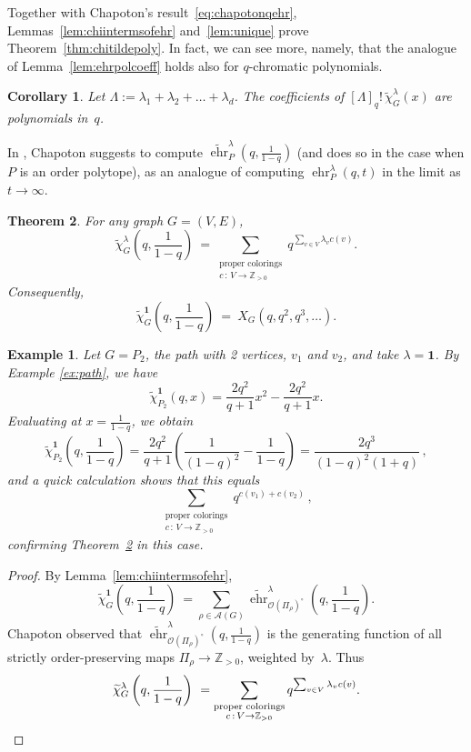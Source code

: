 \documentclass[11pt]{amsart}
\newtheorem{theorem}{Theorem} %
\newtheorem{corollary}[theorem]{Corollary}
\newtheorem{exam}{Example}
\newenvironment{example}{\begin{exam}\sf}{\end{exam}}
\newcommand\ehr{\operatorname{ehr}}
\newcommand\ZZ{\mathbb{Z}}
\newcommand\bone{\mathbf{1}}
\begin{document}
Together with Chapoton's result~\eqref{eq:chapotonqehr},  Lemmas~\ref{lem:chiintermsofehr} and~\ref{lem:unique} prove Theorem~\ref{thm:chitildepoly}. 
In fact, we can see more, namely, that the analogue of Lemma~\ref{lem:ehrpolcoeff} holds also for $q$-chromatic polynomials.

\begin{corollary}
Let $\Lambda := \lambda_1 + \lambda_2 + \dots + \lambda_d$.
The coefficients of $[\Lambda]_q! \, \widetilde{\chi}^\lambda_G(x)$ are polynomials in~$q$.
\end{corollary}

In \cite[Section~4.1]{Chapoton}, Chapoton suggests to compute $\widetilde{\ehr}^\lambda_P (q, \frac{ 1 }{
1-q })$ (and does so in the case when $P$ is an order polytope), as an analogue of computing $\ehr_P^\lambda(q,t)$ in the limit as $t \to \infty$.

\begin{theorem}\label{thm:oneoveroneminusq}
For any graph $G=(V,E)$,
\[
\widetilde{\chi}_G^\lambda \left( q, \frac{ 1 }{ 1-q } \right) \ = \sum_{\substack{\text{proper colorings}\\
c\,:\,V\to \ZZ_{ > 0 } }} q^{ \sum_{ v \in V } \lambda_v c(v) }.
\]
Consequently,
\[
\widetilde{\chi}_G^\bone \left( q, \frac{ 1 }{ 1-q } \right) \ = \ X_G \left( q, q^2, q^3, \dots \right) .
\]
\end{theorem}


\begin{example}
Let $G=P_2$, the path with 2 vertices, $v_1$ and $v_2$, and take $\lambda =\bone$. 
By Example \ref{ex:path}, we have \[\widetilde{\chi}_{P_2}^\bone(q,x) = \frac{2q^2}{q+1}x^2 - \frac{2q^2}{q+1}x. \]
Evaluating at $x= \frac{1}{1-q}$, we obtain \[\widetilde{\chi}_{P_2}^\bone\left(q,\frac{1}{1-q}\right) =
\frac{2q^2}{q+1} \left( \frac{1}{(1-q)^2} - \frac{1}{1-q}\right) = \frac{2q^3}{(1-q)^2(1+q)} \, , \]
and a quick calculation shows that 
this equals \[\sum_{\substack{\text{proper colorings}\\
c\,:\,V\to \ZZ_{ > 0 } }} q^{c(v_1)+c(v_2)} \, , \]
confirming Theorem~\ref{thm:oneoveroneminusq} in this case.
\end{example}



\begin{proof}
By Lemma~\eqref{lem:chiintermsofehr},
\[
\widetilde{\chi}_G^\bone \left( q, \frac{ 1 }{ 1-q } \right) \ = \sum_{\rho\in \mathcal{A}(G)}
\widetilde{\ehr}_{\mathcal{O}(\Pi_\rho)^\circ}^\lambda\left( q, \frac{ 1 }{ 1-q } \right) .
\]
Chapoton \cite[Section~4.1]{Chapoton} observed that
$\widetilde{\ehr}_{\mathcal{O}(\Pi_\rho)^\circ}^\lambda( q, \frac{ 1 }{ 1-q } )$ is the generating
function of all strictly order-preserving maps $\Pi_\rho \to \ZZ_{ > 0 }$, weighted by~$\lambda$. Thus
\[
\widetilde{\chi}_G^\lambda \left( q, \frac{ 1 }{ 1-q } \right) \ = \sum_{\substack{\text{proper colorings}\\
c\,:\,V\to \ZZ_{ > 0 } }} q^{ \sum_{ v \in V } \lambda_v c(v) }. \qedhere
\]
\end{proof}
\end{document}
